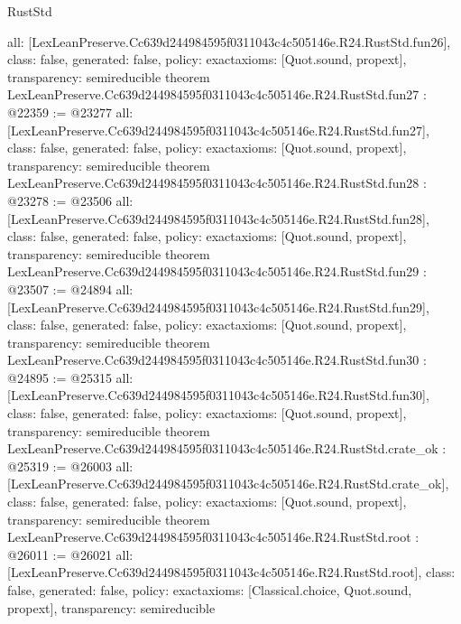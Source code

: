 \begin{lexlean}{RustStd}
\begin{coremodule}
{  all: [LexLeanPreserve.Cc639d244984595f0311043c4c505146e.R24.RustStd.fun26],
  class: false,
  generated: false,
  policy: exact{axioms: [Quot.sound, propext]},
  transparency: semireducible
}
theorem LexLeanPreserve.Cc639d244984595f0311043c4c505146e.R24.RustStd.fun27 : @22359 := @23277 {
  all: [LexLeanPreserve.Cc639d244984595f0311043c4c505146e.R24.RustStd.fun27],
  class: false,
  generated: false,
  policy: exact{axioms: [Quot.sound, propext]},
  transparency: semireducible
}
theorem LexLeanPreserve.Cc639d244984595f0311043c4c505146e.R24.RustStd.fun28 : @23278 := @23506 {
  all: [LexLeanPreserve.Cc639d244984595f0311043c4c505146e.R24.RustStd.fun28],
  class: false,
  generated: false,
  policy: exact{axioms: [Quot.sound, propext]},
  transparency: semireducible
}
theorem LexLeanPreserve.Cc639d244984595f0311043c4c505146e.R24.RustStd.fun29 : @23507 := @24894 {
  all: [LexLeanPreserve.Cc639d244984595f0311043c4c505146e.R24.RustStd.fun29],
  class: false,
  generated: false,
  policy: exact{axioms: [Quot.sound, propext]},
  transparency: semireducible
}
theorem LexLeanPreserve.Cc639d244984595f0311043c4c505146e.R24.RustStd.fun30 : @24895 := @25315 {
  all: [LexLeanPreserve.Cc639d244984595f0311043c4c505146e.R24.RustStd.fun30],
  class: false,
  generated: false,
  policy: exact{axioms: [Quot.sound, propext]},
  transparency: semireducible
}
theorem LexLeanPreserve.Cc639d244984595f0311043c4c505146e.R24.RustStd.crate_ok : @25319 := @26003 {
  all: [LexLeanPreserve.Cc639d244984595f0311043c4c505146e.R24.RustStd.crate_ok],
  class: false,
  generated: false,
  policy: exact{axioms: [Quot.sound, propext]},
  transparency: semireducible
}
theorem LexLeanPreserve.Cc639d244984595f0311043c4c505146e.R24.RustStd.root : @26011 := @26021 {
  all: [LexLeanPreserve.Cc639d244984595f0311043c4c505146e.R24.RustStd.root],
  class: false,
  generated: false,
  policy: exact{axioms: [Classical.choice, Quot.sound, propext]},
  transparency: semireducible
}


\end{coremodule}
\end{lexlean}
